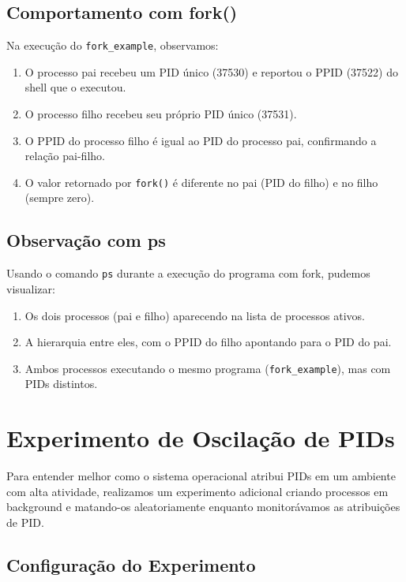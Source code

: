 \documentclass[a4paper,11pt]{article}
\begin{document}
\subsection{Comportamento com fork()}

Na execução do \texttt{fork\_example}, observamos:

\begin{enumerate}
    \item O processo pai recebeu um PID único (37530) e reportou o PPID (37522) do shell que o executou.
    \item O processo filho recebeu seu próprio PID único (37531).
    \item O PPID do processo filho é igual ao PID do processo pai, confirmando a relação pai-filho.
    \item O valor retornado por \texttt{fork()} é diferente no pai (PID do filho) e no filho (sempre zero).
\end{enumerate}

\subsection{Observação com ps}

Usando o comando \texttt{ps} durante a execução do programa com fork, pudemos visualizar:

\begin{enumerate}
    \item Os dois processos (pai e filho) aparecendo na lista de processos ativos.
    \item A hierarquia entre eles, com o PPID do filho apontando para o PID do pai.
    \item Ambos processos executando o mesmo programa (\texttt{fork\_example}), mas com PIDs distintos.
\end{enumerate}

\section{Experimento de Oscilação de PIDs}

Para entender melhor como o sistema operacional atribui PIDs em um ambiente com alta atividade, realizamos um experimento adicional criando processos em background e matando-os aleatoriamente enquanto monitorávamos as atribuições de PID.

\subsection{Configuração do Experimento}
\end{document}
